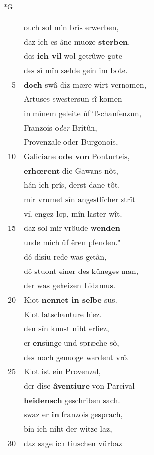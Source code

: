 \documentclass[8pt,a4paper,notitlepage]{article}
\begin{document}
\newpage
\begin{table}[ht]
\begin{minipage}[t]{0.5\linewidth}
\small
\begin{center}*G
\end{center}
\begin{tabular}{rl}
 & ouch sol mîn brîs erwerben,\\ 
 & daz ich es âne muoze \textbf{sterben}.\\ 
 & des \textbf{ich vil} wol getrûwe gote.\\ 
 & des sî mîn sælde gein im bote.\\ 
5 & \textbf{doch} swâ diz mære wirt vernomen,\\ 
 & Artuses swestersun sî komen\\ 
 & in mînem geleite ûf Tschanfenzun,\\ 
 & Franzois o\textit{der} Britûn,\\ 
 & Provenzale oder Burgonois,\\ 
10 & Galiciane \textbf{ode von} Ponturteis,\\ 
 & \textbf{erhœrent} die Gawans nôt,\\ 
 & hân ich prîs, derst dane tôt.\\ 
 & mir vrumet sîn angestlîcher strît\\ 
 & vil engez lop, mîn laster wît.\\ 
15 & daz sol mir vröude \textbf{wenden}\\ 
 & unde mich ûf êren pfenden."\\ 
 & dô disiu rede was getân,\\ 
 & dô stuont einer des küneges man,\\ 
 & der was geheizen Lidamus.\\ 
20 & Kiot \textbf{nennet in selbe} sus.\\ 
 & Kiot latschanture hiez,\\ 
 & den sîn kunst niht erliez,\\ 
 & er \textbf{en}sünge und spræche sô,\\ 
 & des noch genuoge werdent vrô.\\ 
25 & Kiot ist ein Provenzal,\\ 
 & der dise \textbf{âventiure} von Parcival\\ 
 & \textbf{heidensch} geschriben sach.\\ 
 & swaz er \textbf{in} franzois gesprach,\\ 
 & bin ich niht der witze laz,\\ 
30 & daz sage ich tiuschen vürbaz.\\ 

\end{tabular}
\end{minipage}
\end{table}
\end{document}
